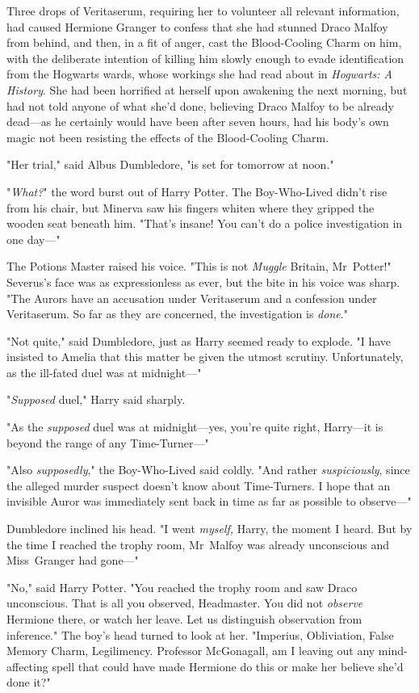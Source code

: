 Three drops of Veritaserum, requiring her to volunteer all relevant
information, had caused Hermione Granger to confess that she had stunned Draco
Malfoy from behind, and then, in a fit of anger, cast the Blood-Cooling Charm
on him, with the deliberate intention of killing him slowly enough to evade
identification from the Hogwarts wards, whose workings she had read about in
\emph{Hogwarts: A History}. She had been horrified at herself upon awakening
the next morning, but had not told anyone of what she'd done, believing Draco
Malfoy to be already dead—as he certainly would have been after seven hours,
had his body's own magic not been resisting the effects of the Blood-Cooling
Charm.

"Her trial," said Albus Dumbledore, "is set for tomorrow at noon."

"\emph{What?}" the word burst out of Harry Potter. The Boy-Who-Lived didn't
rise from his chair, but Minerva saw his fingers whiten where they gripped the
wooden seat beneath him. "That's insane! You can't do a police investigation in
one day—"

The Potions Master raised his voice. "This is not \emph{Muggle} Britain,
Mr~Potter!" Severus's face was as expressionless as ever, but the bite in his
voice was sharp. "The Aurors have an accusation under Veritaserum and a
confession under Veritaserum. So far as they are concerned, the investigation
is \emph{done}."

"Not quite," said Dumbledore, just as Harry seemed ready to explode. "I have
insisted to Amelia that this matter be given the utmost scrutiny.
Unfortunately, as the ill-fated duel was at midnight—"

"\emph{Supposed} duel," Harry said sharply.

"As the \emph{supposed} duel was at midnight—yes, you're quite right,
Harry—it is beyond the range of any Time-Turner—"

"Also \emph{supposedly}," the Boy-Who-Lived said coldly. "And rather
\emph{suspiciously}, since the alleged murder suspect doesn't know about
Time-Turners. I hope that an invisible Auror was immediately sent back in time
as far as possible to observe—"

Dumbledore inclined his head. "I went \emph{myself,} Harry, the moment I heard.
But by the time I reached the trophy room, Mr~Malfoy was already unconscious
and Miss~Granger had gone—"

"No," said Harry Potter. "You reached the trophy room and saw Draco
unconscious. That is all you observed, Headmaster. You did not \emph{observe}
Hermione there, or watch her leave. Let us distinguish observation from
inference." The boy's head turned to look at her. "Imperius, Obliviation, False
Memory Charm, Legilimency. Professor McGonagall, am I leaving out any
mind-affecting spell that could have made Hermione do this or make her believe
she'd done it?"

